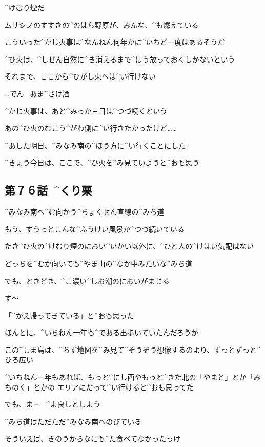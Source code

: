 \page
\A ^{けむり}{煙}だ

\A ムサシノのすすきの^{のはら}{野原}が、みんな、^{も}{燃}えている

\A こういった^{かじ}{火事}は^{なんねん}{何年}かに^{いちど}{一度}はあるそうだ

\A ^{ひ}{火}は、^{しぜん}{自然}に^{き}{消}えるまで^{ほう}{放}っておくしかないという

\A それまで、ここから^{ひがし}{東}へは^{い}{行}けない

\page[139]
\Sign …でん
\ あま^{さけ}{酒}

\A ^{かじ}{火事}は、あと^{みっか}{三日}は^{つづ}{続}くという

\A あの^{ひ}{火}のむこう^{がわ}{側}に^{い}{行}きたかったけど……

\page
\A ^{あした}{明日}、^{みなみ}{南}の^{ほう}{方}に^{い}{行}くことにした

\A ^{きょう}{今日}は、ここで、^{ひ}{火}を^{み}{見}ていようと^{おも}{思}う


\subsection{第７６話\ ^{くり}{栗}}

\page[142]
\A ^{みなみ}{南}へ^{む}{向}かう^{ちょくせん}{直線}の^{みち}{道}

\A もう、ずうっとこんな^{ふうけい}{風景}が^{つづ}{続}いている

\A たき^{ひ}{火}の^{けむり}{煙}のにおい^{いがい}{以外}に、^{ひと}{人}の^{けはい}{気配}はない

\page
\A どっちを^{むか}{向}いても^{やま}{山}の^{なか}{中}みたいな^{みち}{道}

\A でも、ときどき、^{こ}{濃}い^{しお}{潮}のにおいがまじる

\A す〜

\A 「^{かえ}{帰}ってきている」と^{おも}{思}った

\A ほんとに、^{いちねん}{一年}も^{である}{出歩}いていたんだろうか

\page
\A この^{しま}{島}は、^{ちず}{地図}を^{み}{見}て^{そうぞう}{想像}するのより、ずっとずっと^{ひろ}{広}い

\A ^{いちねん}{一年}もあれば、もっと^{にし}{西}やもっと^{きた}{北}の「やまと」とか「みちのく」とかの
エリアにだって^{い}{行}けると^{おも}{思}ってた

\A でも、まー
\ ^{よ}{良}しとしよう

\page
\A ^{みち}{道}はただただ^{みなみ}{南}へのびている

\page
\A そういえば、きのうからなにも^{た}{食}べてなかったっけ

